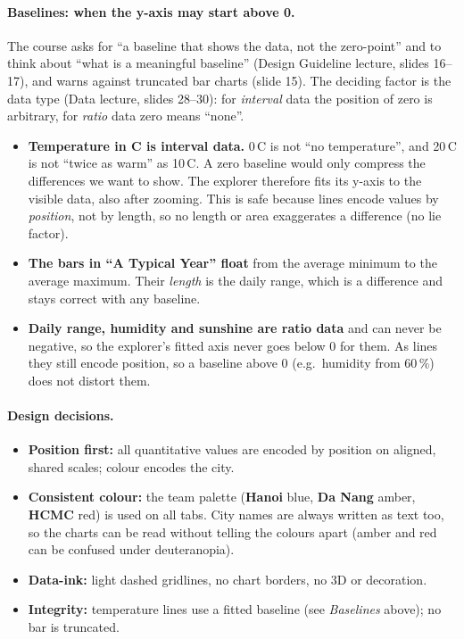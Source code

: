 \documentclass[11pt,a4paper]{article}
\newcommand{\HN}{\textcolor{hanoi}{\textbf{Hanoi}}}
\newcommand{\DN}{\textcolor{danang}{\textbf{Da Nang}}}
\newcommand{\HCM}{\textcolor{hcm}{\textbf{HCMC}}}
\begin{document}
\paragraph{Baselines: when the y-axis may start above 0.}
The course asks for ``a baseline that shows the data, not the zero-point'' and to think about ``what is a meaningful baseline''
(Design Guideline lecture, slides 16--17), and warns against truncated bar charts (slide 15). The deciding factor is the data type
(Data lecture, slides 28--30): for \emph{interval} data the position of zero is arbitrary, for \emph{ratio} data zero means ``none''.
\begin{itemize}
    \item \textbf{Temperature in \textdegree C is interval data.} 0\,\textdegree C is not ``no temperature'', and 20\,\textdegree C is not
    ``twice as warm'' as 10\,\textdegree C. A zero baseline would only compress the differences we want to show. The explorer therefore
    fits its y-axis to the visible data, also after zooming. This is safe because lines encode values by \emph{position}, not by
    length, so no length or area exaggerates a difference (no lie factor).
    \item \textbf{The bars in ``A Typical Year'' float} from the average minimum to the average maximum. Their \emph{length} is the
    daily range, which is a difference and stays correct with any baseline.
    \item \textbf{Daily range, humidity and sunshine are ratio data} and can never be negative, so the explorer's fitted axis never
    goes below 0 for them. As lines they still encode position, so a baseline above 0 (e.g.\ humidity from 60\,\%) does not distort them.
\end{itemize}

\paragraph{Design decisions.}
\begin{itemize}
    \item \textbf{Position first:} all quantitative values are encoded by position on aligned, shared scales; colour encodes the city.
    \item \textbf{Consistent colour:} the team palette (\HN{} blue, \DN{} amber, \HCM{} red) is used on all tabs. City names are always written
    as text too, so the charts can be read without telling the colours apart (amber and red can be confused under deuteranopia).
    \item \textbf{Data-ink:} light dashed gridlines, no chart borders, no 3D or decoration.
    \item \textbf{Integrity:} temperature lines use a fitted baseline (see \emph{Baselines} above); no bar is truncated.
\end{itemize}
\end{document}
